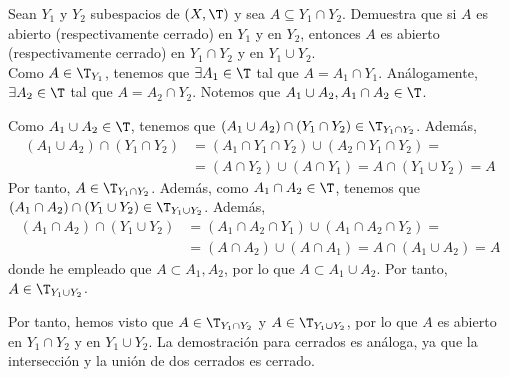 \begin{ejercicio} \label{ej:Rel3.6}
    Sean $Y_1$ y $Y_2$ subespacios de $(X, \T)$ y sea $A \subseteq Y_1 \cap Y_2$.
    Demuestra que si $A$ es abierto (respectivamente cerrado) en $Y_1$ y en $Y_2$, entonces $A$ es abierto (respectivamente cerrado) en $Y_1 \cap Y_2$ y en $Y_1 \cup Y_2$.\\

    Como $A\in \T_{Y_1}$, tenemos que $\exists A_1\in \T$ tal que $A=A_1\cap Y_1$. Análogamente, $\exists A_2\in \T$ tal que $A=A_2\cap Y_2$. Notemos que $A_1\cup A_2, A_1\cap A_2\in \T$.

    Como $A_1\cup A_2\in \T$, tenemos que $(A_1\cup A_2)\cap (Y_1\cap Y_2)\in \T_{Y_1\cap Y_2}$. Además,
    \begin{align*}
        (A_1\cup A_2)\cap (Y_1\cap Y_2) &= (A_1\cap Y_1 \cap Y_2)\cup (A_2\cap Y_1\cap Y_2) =\\&= (A\cap Y_2) \cup (A\cap Y_1) = A \cap (Y_1\cup Y_2) = A
    \end{align*}
    Por tanto, $A\in \T_{Y_1\cap Y_2}$. Además, como $A_1\cap A_2\in \T$, tenemos que $(A_1\cap A_2)\cap (Y_1\cup Y_2)\in \T_{Y_1\cup Y_2}$. Además,
    \begin{align*}
        (A_1\cap A_2)\cap (Y_1\cup Y_2) &= (A_1\cap A_2 \cap Y_1)\cup (A_1\cap A_2 \cap Y_2) =\\&= (A\cap A_2) \cup (A\cap A_1) = A \cap (A_1\cup A_2) = A
    \end{align*}
    donde he empleado que $A \subset A_1,A_2$, por lo que $A\subset A_1\cup A_2$. Por tanto, $A\in \T_{Y_1\cup Y_2}$.

    Por tanto, hemos visto que $A\in \T_{Y_1\cap Y_2}$ y $A\in \T_{Y_1\cup Y_2}$, por lo que $A$ es abierto en $Y_1\cap Y_2$ y en $Y_1\cup Y_2$. La demostración para cerrados es análoga,
    ya que la intersección y la unión de dos cerrados es cerrado.
\end{ejercicio}

